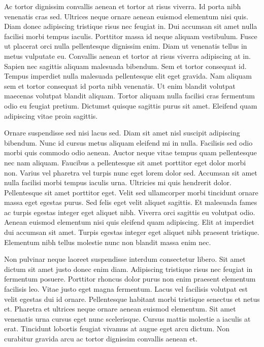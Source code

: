 \documentclass[11pt,a4paper]{article}
\begin{document}
Ac tortor dignissim convallis aenean et tortor at risus viverra. Id porta nibh venenatis cras sed. Ultrices neque ornare aenean euismod elementum nisi quis. Diam donec adipiscing tristique risus nec feugiat in. Dui accumsan sit amet nulla facilisi morbi tempus iaculis. Porttitor massa id neque aliquam vestibulum. Fusce ut placerat orci nulla pellentesque dignissim enim. Diam ut venenatis tellus in metus vulputate eu. Convallis aenean et tortor at risus viverra adipiscing at in. Sapien nec sagittis aliquam malesuada bibendum. Sem et tortor consequat id. Tempus imperdiet nulla malesuada pellentesque elit eget gravida. Nam aliquam sem et tortor consequat id porta nibh venenatis. Ut enim blandit volutpat maecenas volutpat blandit aliquam. Tortor aliquam nulla facilisi cras fermentum odio eu feugiat pretium. Dictumst quisque sagittis purus sit amet. Eleifend quam adipiscing vitae proin sagittis.

Ornare suspendisse sed nisi lacus sed. Diam sit amet nisl suscipit adipiscing bibendum. Nunc id cursus metus aliquam eleifend mi in nulla. Facilisis sed odio morbi quis commodo odio aenean. Auctor neque vitae tempus quam pellentesque nec nam aliquam. Faucibus a pellentesque sit amet porttitor eget dolor morbi non. Varius vel pharetra vel turpis nunc eget lorem dolor sed. Accumsan sit amet nulla facilisi morbi tempus iaculis urna. Ultricies mi quis hendrerit dolor. Pellentesque sit amet porttitor eget. Velit sed ullamcorper morbi tincidunt ornare massa eget egestas purus. Sed felis eget velit aliquet sagittis. Et malesuada fames ac turpis egestas integer eget aliquet nibh. Viverra orci sagittis eu volutpat odio. Aenean euismod elementum nisi quis eleifend quam adipiscing. Elit at imperdiet dui accumsan sit amet. Turpis egestas integer eget aliquet nibh praesent tristique. Elementum nibh tellus molestie nunc non blandit massa enim nec.

Non pulvinar neque laoreet suspendisse interdum consectetur libero. Sit amet dictum sit amet justo donec enim diam. Adipiscing tristique risus nec feugiat in fermentum posuere. Porttitor rhoncus dolor purus non enim praesent elementum facilisis leo. Vitae justo eget magna fermentum. Lacus vel facilisis volutpat est velit egestas dui id ornare. Pellentesque habitant morbi tristique senectus et netus et. Pharetra et ultrices neque ornare aenean euismod elementum. Sit amet venenatis urna cursus eget nunc scelerisque. Cursus mattis molestie a iaculis at erat. Tincidunt lobortis feugiat vivamus at augue eget arcu dictum. Non curabitur gravida arcu ac tortor dignissim convallis aenean et.
\end{document}
